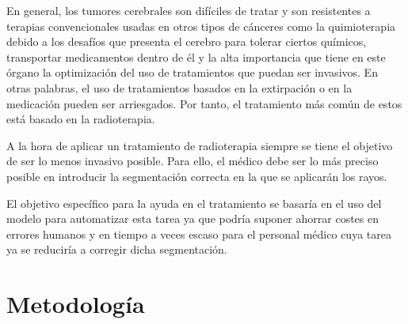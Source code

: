 En general, los tumores cerebrales son difíciles de tratar y son resistentes a terapias convencionales usadas en otros tipos de cánceres como la quimioterapia debido a los desafíos que presenta el cerebro para tolerar ciertos químicos, transportar medicamentos dentro de él y la alta importancia que tiene en este órgano la optimización del uso de tratamientos que puedan ser invasivos. En otras palabras, el uso de tratamientos basados en la extirpación o en la medicación pueden ser arriesgados. Por tanto, el tratamiento más común de estos está basado en la radioterapia.

A la hora de aplicar un tratamiento de radioterapia siempre se tiene el objetivo de ser lo menos invasivo posible. Para ello, el médico debe ser lo más preciso posible en introducir la segmentación correcta en la que se aplicarán los rayos. 

El objetivo específico para la ayuda en el tratamiento se basaría en el uso del modelo para automatizar esta tarea ya que podría suponer ahorrar costes en errores humanos y en tiempo a veces escaso para el personal médico cuya tarea ya se reduciría a corregir dicha segmentación.
 




\section{Metodología}
